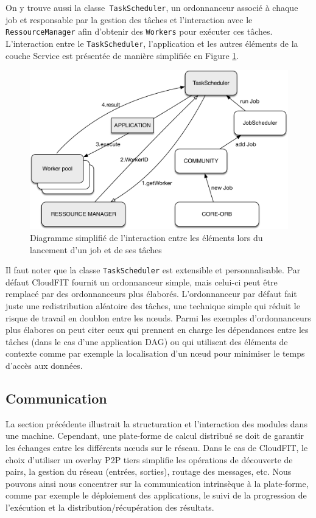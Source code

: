 On y trouve aussi la classe\texttt{ TaskScheduler}, un ordonnanceur associé à chaque job et responsable par la gestion des tâches et l'interaction avec le \texttt{RessourceManager} afin d'obtenir des \texttt{Workers} pour exécuter ces tâches. L'interaction entre le \texttt{TaskScheduler}, l'application et les autres éléments de la couche Service est présentée de manière simplifiée en Figure \ref{Figure:applayer}. 

\begin{figure}
	\centering
		\includegraphics[width=0.65\linewidth]{img/CloudFITstack-app}
		\caption{Diagramme simplifié de l'interaction entre les éléments lors du lancement d'un job et de ses tâches}\label{Figure:applayer}
\end{figure}

Il faut noter que la classe \texttt{TaskScheduler} est extensible et personnalisable. Par défaut CloudFIT fournit un ordonnanceur simple, mais celui-ci peut être remplacé par des ordonnanceurs plus élaborés. L'ordonnanceur par défaut fait juste une redistribution aléatoire des tâches, une technique simple qui réduit le risque de travail en doublon entre les n{\oe}uds. Parmi les exemples d'ordonnanceurs plus élabores on peut citer ceux qui prennent en charge les dépendances entre les tâches (dans le cas d'une application DAG) ou qui utilisent des éléments de contexte comme par exemple la localisation d'un n{\oe}ud pour minimiser le temps d'accès aux données. 




\subsection{Communication\label{subsec:commCloudFIT}}

La section précédente illustrait la structuration et l'interaction des modules dans une machine. Cependant, une plate-forme de calcul distribué se doit de garantir les échanges entre les différents n{\oe}uds sur le réseau. Dans le cas de CloudFIT, le choix d'utiliser un overlay P2P tiers simplifie les opérations de découverte de pairs, la gestion du réseau (entrées, sorties), routage des messages, etc. Nous pouvons ainsi nous concentrer sur la communication intrinsèque à la plate-forme, comme par exemple le déploiement des applications, le suivi de la progression de l'exécution et la distribution/récupération des résultats. 

